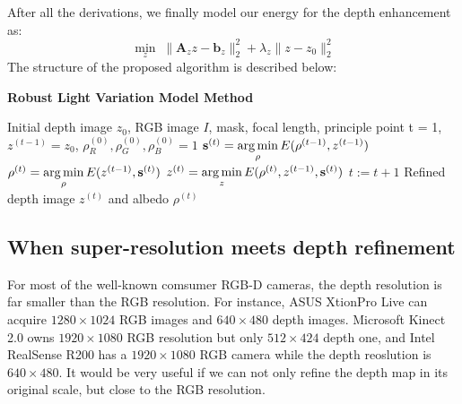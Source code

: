 After all the derivations, we finally model our energy for the depth enhancement as:
 \begin{equation}\label{eq:robust_depth_estimate}
	\min_{z} \; \lVert  \mathbf{A}_{z}z - \mathbf{b}_z\rVert^2_2 + \lambda_{z}\lVert z - z_0 \rVert_2^2
\end{equation}
The structure of the proposed algorithm is described below:
\begin{algorithm}[!htbp]
	\begin{algorithmic}[1] 
  		\caption{\textbf{Robust Light Variation Model Method}}
		\label{alg:robust}
		 \renewcommand{\algorithmicrequire}{\textbf{Input:}}
		 \renewcommand{\algorithmicensure}{\textbf{Output:}}
		 \REQUIRE Initial depth image $z_0$, RGB image $I$, mask, focal length, principle point
		 \vspace{1.8mm}
		 \STATE t = 1, $z^{(t-1)} = z_0$, $\rho^{(0)}_R, \rho^{(0)}_G, \rho^{(0)}_B = 1$
		 \vspace{1.8mm}
		       \vspace{1.8mm}
		        \STATE $\mathbf{s}^{(t)} = \operatorname*{arg\,min} \limits_{\rho} E(\rho^{(t-1)}, z^{(t-1)})$ 
			\STATE $\rho^{(t)} = \operatorname*{arg\,min} \limits_{\rho} E(z^{(t-1)}, \mathbf{s}^{(t)})$ 
			  \STATE $z^{(t)} = \operatorname*{arg\,min} \limits_{z} E(\rho^{(t)}, z^{(t-1)}, \mathbf{s}^{(t)})$ 
			  \vspace{1.8mm}
		          \STATE $t := t + 1$
		 \vspace{1.8mm}
		  \ENDWHILE
		  \ENSURE  Refined depth image $z^{(t)}$ and albedo $\rho^{(t)}$
	\end{algorithmic}
\end{algorithm}

\subsection{When super-resolution meets depth refinement}
For most of the well-known comsumer RGB-D cameras, the depth resolution is far smaller than the RGB resolution.
For instance, ASUS XtionPro Live can acquire $1280\times 1024$ RGB images and $640\times 480$ depth images. Microsoft Kinect 2.0 owns $1920\times1080$ RGB resolution but only $512\times424$ depth one, and Intel RealSense R200 has a $1920\times1080$ RGB camera while the depth reoslution is $640\times 480$.
It would be very useful if we can not only refine the depth map in its original scale, but close to the RGB resolution.  

